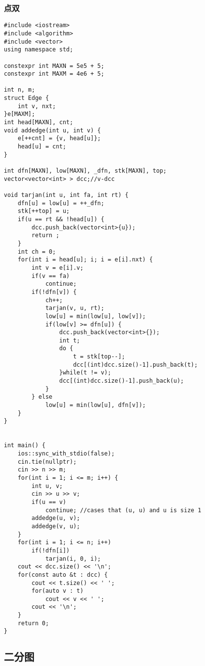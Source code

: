 \documentclass{article}
\begin{document}
	\subsubsection{点双}
\begin{lstlisting}
#include <iostream>
#include <algorithm>
#include <vector>
using namespace std;

constexpr int MAXN = 5e5 + 5;
constexpr int MAXM = 4e6 + 5;

int n, m;
struct Edge {
    int v, nxt;
}e[MAXM];
int head[MAXN], cnt;
void addedge(int u, int v) {
    e[++cnt] = {v, head[u]};
    head[u] = cnt;
}

int dfn[MAXN], low[MAXN], _dfn, stk[MAXN], top;
vector<vector<int> > dcc;//v-dcc

void tarjan(int u, int fa, int rt) {
    dfn[u] = low[u] = ++_dfn;
    stk[++top] = u;
    if(u == rt && !head[u]) {
        dcc.push_back(vector<int>{u});
        return ;
    }
    int ch = 0;
    for(int i = head[u]; i; i = e[i].nxt) {
        int v = e[i].v;
        if(v == fa)
            continue;
        if(!dfn[v]) {
            ch++;
            tarjan(v, u, rt);
            low[u] = min(low[u], low[v]);
            if(low[v] >= dfn[u]) {
                dcc.push_back(vector<int>{});
                int t;
                do {
                    t = stk[top--];
                    dcc[(int)dcc.size()-1].push_back(t);
                }while(t != v);
                dcc[(int)dcc.size()-1].push_back(u);
            }
        } else
            low[u] = min(low[u], dfn[v]);
    } 
}


int main() {
    ios::sync_with_stdio(false);
    cin.tie(nullptr);
    cin >> n >> m;
    for(int i = 1; i <= m; i++) {
        int u, v;
        cin >> u >> v;
        if(u == v)
            continue; //cases that (u, u) and u is size 1
        addedge(u, v);
        addedge(v, u);
    }
    for(int i = 1; i <= n; i++)
        if(!dfn[i])
            tarjan(i, 0, i);
    cout << dcc.size() << '\n';
    for(const auto &t : dcc) {
        cout << t.size() << ' ';
        for(auto v : t)
            cout << v << ' ';
        cout << '\n';
    }
    return 0;
}
\end{lstlisting}
    \subsection{二分图}
\end{document}
